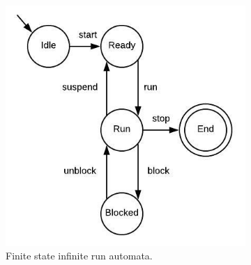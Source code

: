 \begin{figure}
\begin{subfigure}[b]{0.2\textwidth}
\includegraphics[width=\textwidth]{fsaex}
\caption{Finite state infinite run automata.}
\label{fig:fsaex}
\end{subfigure}
\quad
\begin{subfigure}[b]{0.16\textwidth}

\end{subfigure}
\end{figure}

